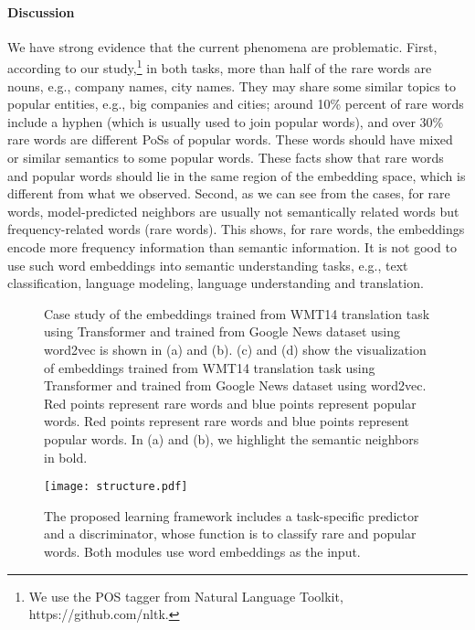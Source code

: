 \documentclass{article}
\begin{document}
\paragraph{Discussion} We have strong evidence that the current phenomena are problematic. First, according to our study,\footnote{We use the POS tagger from Natural Language Toolkit, https://github.com/nltk.} in both tasks, more than half of the rare words are nouns, e.g., company names, city names. They may share some similar topics to popular entities, e.g., big companies and cities; around 10\% percent of rare words include a hyphen (which is usually used to join popular words), and over 30\% rare words are different PoSs of popular words. These words should have mixed or similar semantics to some popular words. These facts show that rare words and popular words should lie in the same region of the embedding space, which is different from what we observed. Second, as we can see from the cases, for rare words, model-predicted neighbors are usually not semantically related words but frequency-related words (rare words). This shows, for rare words, the embeddings encode more frequency information than semantic information. It is not good to use such word embeddings into semantic understanding tasks, e.g., text classification, language modeling, language understanding and translation.

\begin{figure}[!tbp]
\centering
{}
\caption{Case study of the embeddings trained from WMT14 translation task using Transformer and trained from Google News dataset using word2vec is shown in (a) and (b). (c) and (d)
show the visualization of embeddings trained from WMT14 translation task using Transformer and trained from Google News dataset using word2vec. Red points represent rare words and blue points represent popular words.
Red points represent rare words and blue points represent popular words. In (a) and (b), we highlight the semantic neighbors in bold. }
\label{fig:1}
\end{figure}




\begin{figure}[!tbp]
\centering
\texttt{[image: structure.pdf]}
\caption{The proposed learning framework includes a task-specific predictor and a discriminator, whose function is to classify rare and popular words. Both modules use word embeddings as the input.}
\label{structure-fig}
\end{figure}
\end{document}
